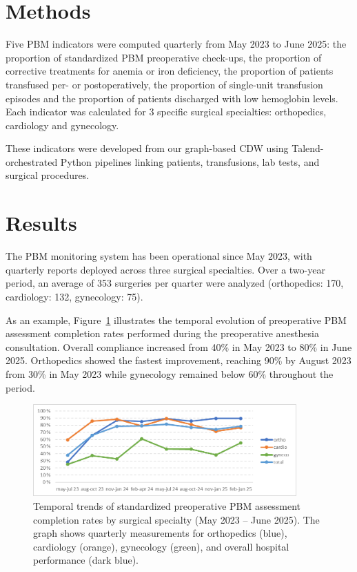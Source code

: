 \documentclass{IOS-Book-Article}
\begin{document}
\section{Methods}

Five PBM indicators were computed quarterly from May 2023 to June 2025: the proportion of standardized PBM preoperative check-ups, the proportion of corrective treatments for anemia or iron deficiency, the proportion of patients transfused per- or postoperatively, the proportion of single-unit transfusion episodes and the proportion of patients discharged with low hemoglobin levels. Each indicator was calculated for 3 specific surgical specialties: orthopedics, cardiology and gynecology. 

These indicators were developed from our graph-based CDW \cite{Cance2022}
using Talend-orchestrated Python pipelines linking patients, transfusions, lab tests, and surgical procedures.

\section{Results}

The PBM monitoring system has been operational since May 2023, with quarterly 
reports deployed across three surgical specialties. Over a two-year period, an 
average of 353 surgeries per quarter were analyzed (orthopedics: 170, 
cardiology: 132, gynecology: 75).

As an example, Figure~\ref{fig:pbm_trends} illustrates the temporal evolution of preoperative 
PBM assessment completion rates performed during the preoperative anesthesia consultation. Overall compliance increased from 40\% in May 2023 to 80\% in June 2025. Orthopedics showed the fastest improvement, reaching 90\% by August 2023 from 30\% in May 2023 while gynecology remained below 60\% throughout the period.

\begin{figure}[h!]
\centering
\includegraphics[width=0.9\textwidth]{figure.png}
\caption{Temporal trends of standardized preoperative PBM assessment completion rates by surgical specialty (May 2023 -- June 2025). The graph shows quarterly measurements for orthopedics (blue), cardiology (orange), gynecology (green), and overall hospital performance (dark blue).}
\label{fig:pbm_trends}
\vspace{-1em}
\end{figure}
\end{document}
